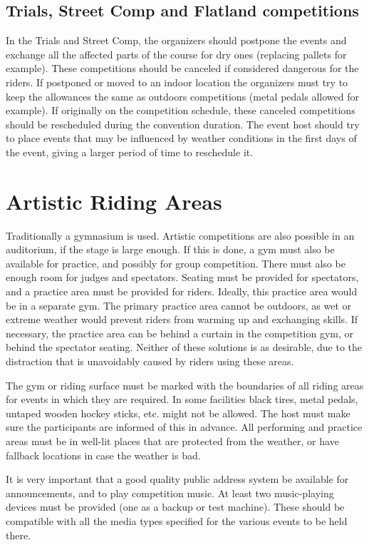 \subsection{Trials, Street Comp and Flatland competitions}
In the Trials and Street Comp, the organizers should postpone the events and exchange all the affected parts of the course for dry ones (replacing pallets for example).
These competitions should be canceled if considered dangerous for the riders.
If postponed or moved to an indoor location the organizers must try to keep the allowances the same as outdoors competitions (metal pedals allowed for example).
If originally on the competition schedule, these canceled competitions should be rescheduled during the convention duration.
The event host should try to place events that may be influenced by weather conditions in the first days of the event, giving a larger period of time to reschedule it.

\section{Artistic Riding Areas}
Traditionally a gymnasium is used.
Artistic competitions are also possible in an auditorium, if the stage is large enough.
If this is done, a gym must also be available for practice, and possibly for group competition.
There must also be enough room for judges and spectators.
Seating must be provided for spectators, and a practice area must be provided for riders.
Ideally, this practice area would be in a separate gym.
The primary practice area cannot be outdoors, as wet or extreme weather would prevent riders from warming up and exchanging skills.
If necessary, the practice area can be behind a curtain in the competition gym, or behind the spectator seating.
Neither of these solutions is as desirable, due to the distraction that is unavoidably caused by riders using these areas.

The gym or riding surface must be marked with the boundaries of all riding areas for events in which they are required.
In some facilities black tires, metal pedals, untaped wooden hockey sticks, etc.
might not be allowed.
The host must make sure the participants are informed of this in advance.
All performing and practice areas must be in well-lit places that are protected from the weather, or have fallback locations in case the weather is bad.

It is very important that a good quality public address system be available for announcements, and to play competition music.
At least two music-playing devices must be provided (one as a backup or test machine).
These should be compatible with all the media types specified for the various events to be held there.

